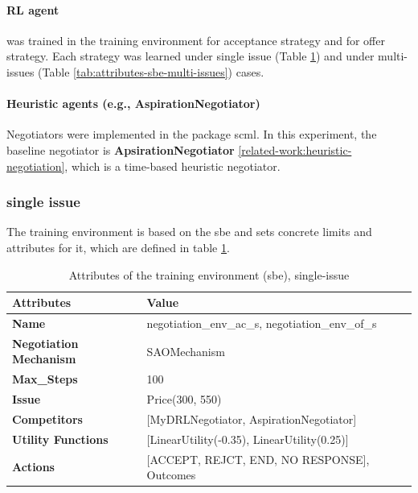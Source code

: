 \paragraph{RL agent} was trained in the training environment for acceptance strategy and for offer strategy. Each strategy was learned under single issue (Table \ref{tab:attributes-sbe}) and under multi-issues (Table \ref{tab:attributes-sbe-multi-issues}) cases. 

\paragraph{Heuristic agents (e.g., AspirationNegotiator)} Negotiators were implemented in the package scml. In this experiment, the baseline negotiator is \textbf{ApsirationNegotiator} \ref{related-work:heuristic-negotiation}, which is a time-based heuristic negotiator.

\subsubsection{single issue}
The training environment is based on the \gls{sbe} and sets concrete limits and attributes for it, which are defined in table \ref{tab:attributes-sbe}.

\begin{table}[htbp]
\centering
\begin{tabular}{l l l} \toprule
\bfseries \textbf{Attributes}      & \bfseries \textbf{Value}             \\ \midrule
\textbf{Name}                    & negotiation\_env\_ac\_s, negotiation\_env\_of\_s \\
\textbf{Negotiation Mechanism}   & SAOMechanism                                        \\
\textbf{Max\_Steps}              & 100                                                 \\
\textbf{Issue}             	     & Price(300, 550)                                     \\
\textbf{Competitors}             & [MyDRLNegotiator, AspirationNegotiator]             \\
\textbf{Utility Functions}       & [LinearUtility(-0.35), LinearUtility(0.25)]         \\
\textbf{Actions}                 & [ACCEPT, REJCT, END, NO RESPONSE], Outcomes\\
\bottomrule
\end{tabular}
\caption{Attributes of the training environment (sbe), single-issue}
\label{tab:attributes-sbe}
\end{table}

